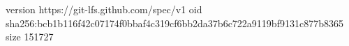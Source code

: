 version https://git-lfs.github.com/spec/v1
oid sha256:bcb1b116f42c07174f0bbaf4c319cf6bb2da37b6c722a9119bf9131c877b8365
size 151727
